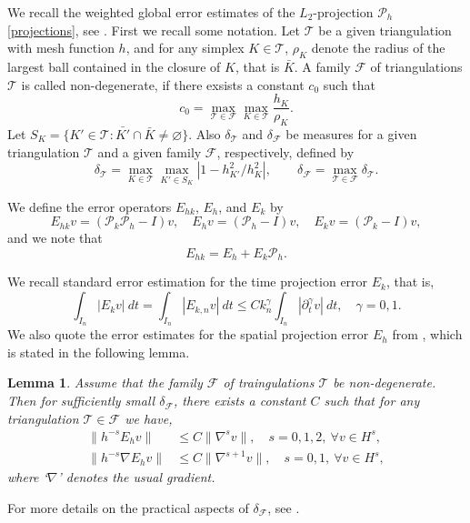 \documentclass{amsart}
\numberwithin{equation}{section}
\newtheorem{lemma}{Lemma}
\theoremstyle{definition}
\begin{document}
We recall the weighted global error estimates of the
$L_2$-projection ${\mathcal P}_h$ \eqref{projections}, see \cite{Boman}.
First we recall some notation.
Let ${\mathcal T}$ be a given triangulation with mesh function $h$,
and for any simplex $K\in{\mathcal T}$,
 $\rho_K$ denote the radius of the largest ball contained in
the closure of $K$, that is $\bar K$.
A family ${\mathcal F} $ of triangulations ${\mathcal T}$ is called non-degenerate,
if there exsists a constant $c_0$ such that
\begin{equation*}
  c_0=\max_{{\mathcal T}\in{\mathcal F} }\max_{K\in{\mathcal T}} \frac{h_K}{\rho_K}.
\end{equation*}
Let $S_K=\{K'\in{\mathcal T} : \bar{K'}\cap\bar{K}\neq \varnothing\}$. 
Also $\delta_{\mathcal T}$ and $\delta_{\mathcal F}$ be measures for a given 
triangulation ${\mathcal T}$ and a given family ${\mathcal F}$, respectively, defined by
\begin{equation*}   
  \delta_{\mathcal T}=\max_{K\in{\mathcal T}}\max_{K'\in S_K}
   |1- h_{K'}^2/h_K^2|, \qquad 
   \delta_{\mathcal F}=\max_{{\mathcal T}\in{\mathcal F} }\delta_{\mathcal T}.
\end{equation*}

We define the error operators $E_{hk},\,E_h$, and $E_k$ by
\begin{equation*}   
  E_{hk}v=({\mathcal P}_k{\mathcal P}_h-I)v,\quad
  E_hv=({\mathcal P}_h-I)v,\quad
  E_kv=({\mathcal P}_k-I)v,
\end{equation*}
and we note that
\begin{equation}   \label{erroroperators:rel}
  E_{hk}=E_h+E_k{\mathcal P}_h.
\end{equation}

We recall standard error estimation for the time projection error 
$E_k$, that is, 
\begin{equation}   \label{errorest-Pk}
  \int_{I_n}|E_k v|\ dt=\int_{I_n}|E_{k,n} v|\ dt 
  \leq C k_n^\gamma \int_{I_n}|\partial_t^\gamma v|\ dt, \quad \gamma=0,1.
\end{equation}
We also quote the error estimates for the spatial projection error 
$E_h$ from \cite{Boman}, which is stated in the following lemma.
\begin{lemma}
Assume that the family ${\mathcal F} $ of traingulations ${\mathcal T}$ be  non-degenerate.
Then for sufficiently small $\delta_{\mathcal F}$, there
exists a constant $C$ such that for any triangulation
${\mathcal T}\in{\mathcal F} $ we have, 
\begin{align}  \label{Lemma1:est1}
  \|h^{-s}E_hv\|&\le C\|\nabla^s v\|,
    \quad s=0,1, 2,\ \forall v\in H^s,\\  \label{Lemma1:est2}
  \|h^{-s}\nabla E_hv\|
     &\le C\|\nabla^{s+1} v\|,\quad s=0, 1,\ \forall v\in H^s,
\end{align}
where `$\nabla$' denotes the usual gradient.
\end{lemma}
\noindent
For more details on the practical aspects of $\delta_{\mathcal F}$,
 see \cite{Boman}.
\end{document}
